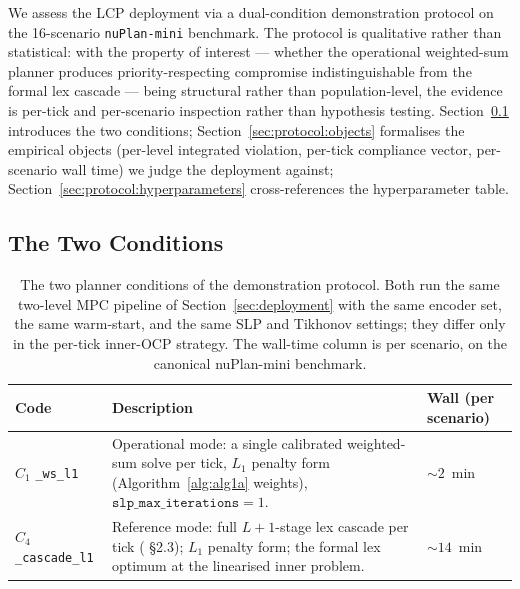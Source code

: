 
We assess the LCP deployment via a dual-condition demonstration protocol on the 16-scenario \texttt{nuPlan-mini} benchmark. The protocol is qualitative rather than statistical: with the property of interest --- whether the operational weighted-sum planner produces priority-respecting compromise indistinguishable from the formal lex cascade --- being structural rather than population-level, the evidence is per-tick and per-scenario inspection rather than hypothesis testing. Section~\ref{sec:protocol:conditions} introduces the two conditions; Section~\ref{sec:protocol:objects} formalises the empirical objects (per-level integrated violation, per-tick compliance vector, per-scenario wall time) we judge the deployment against; Section~\ref{sec:protocol:hyperparameters} cross-references the hyperparameter table.

\subsection{The Two Conditions}
\label{sec:protocol:conditions}

\begin{table}[t]
    \centering
    \caption{The two planner conditions of the demonstration protocol. Both run the same two-level MPC pipeline of Section~\ref{sec:deployment} with the same encoder set, the same warm-start, and the same SLP and Tikhonov settings; they differ only in the per-tick inner-OCP strategy. The wall-time column is per scenario, on the canonical nuPlan-mini benchmark.}
    \label{tab:conditions}
    \footnotesize
    \begin{tabularx}{\linewidth}{@{}l X l@{}}
        \toprule
        Code & Description & Wall (per scenario) \\
        \midrule
        $C_1$ \texttt{\_ws\_l1}        & Operational mode: a single calibrated weighted-sum solve per tick, $L_1$ penalty form (Algorithm~\ref{alg:alg1a} weights), $\mathtt{slp\_max\_iterations}=1$. & $\sim 2$~min \\
        $C_4$ \texttt{\_cascade\_l1}   & Reference mode: full $L{+}1$-stage lex cascade per tick (\cite{lcp2025} \S2.3); $L_1$ penalty form; the formal lex optimum at the linearised inner problem. & $\sim 14$~min \\
        \bottomrule
    \end{tabularx}
\end{table}

